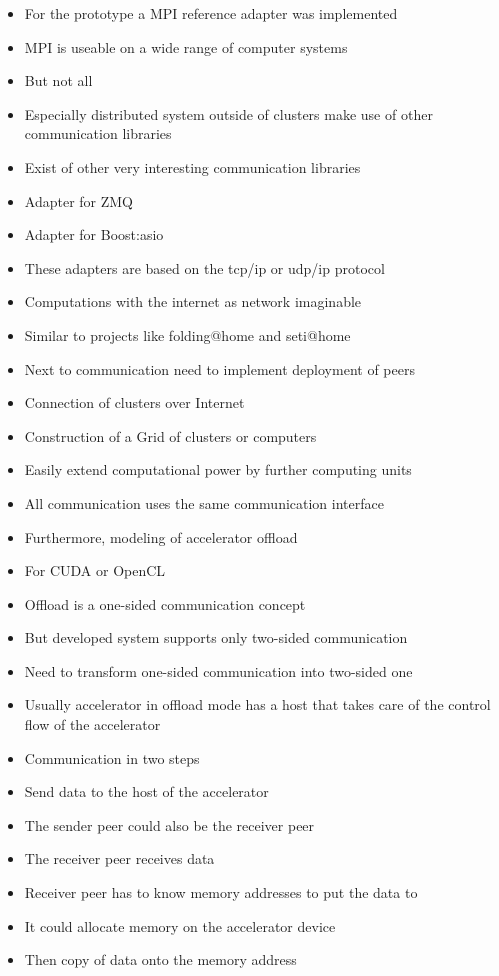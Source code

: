 \begin{itemize}

\item For the prototype a MPI reference adapter was implemented
\item MPI is useable on a wide range of computer systems
\item But not all

\item Especially distributed system outside of clusters make use
  of other communication libraries
\item Exist of other very interesting communication libraries
\item Adapter for ZMQ
\item Adapter for Boost:asio
\item These adapters are based on the tcp/ip or udp/ip protocol
\item Computations with the internet as network imaginable
\item Similar to projects like folding@home and seti@home
\item Next to communication need to implement deployment of peers

\item Connection of clusters over Internet
\item Construction of a Grid of clusters or computers
\item Easily extend computational power by further computing units
\item All communication uses the same communication interface

\item Furthermore, modeling of accelerator offload
\item For CUDA or OpenCL 
\item Offload is a one-sided communication concept
\item But developed system supports only two-sided communication
\item Need to transform one-sided communication into two-sided one
\item Usually accelerator in offload mode has a host that
  takes care of the control flow of the accelerator
\item Communication in two steps
\item Send data to the host of the accelerator
\item The sender peer  could also be the receiver peer
\item The receiver peer receives data
\item Receiver peer has to know memory addresses to put
  the data to
\item It could allocate memory on the accelerator device
\item Then copy of data onto the memory address


\end{itemize}
